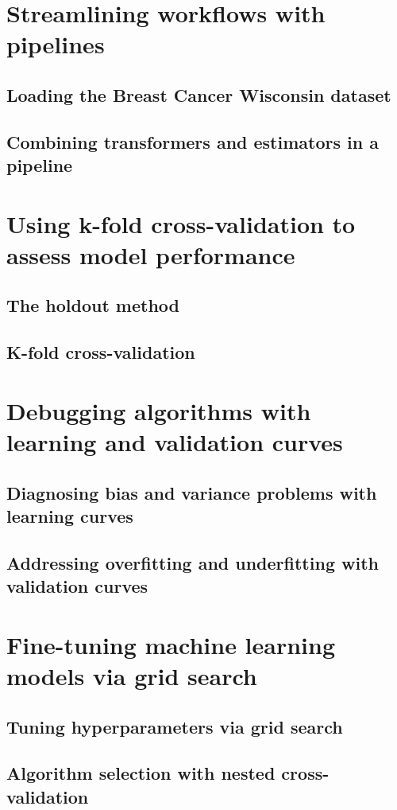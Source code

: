 \documentclass[letterpaper]{report}
\begin{document}
\section{Streamlining workflows with pipelines}
\subsection{Loading the Breast Cancer Wisconsin dataset}
\subsection{Combining transformers and estimators in a pipeline}
\section{Using k-fold cross-validation to assess model performance}
\subsection{The holdout method}
\subsection{K-fold cross-validation}
\section{Debugging algorithms with learning and validation curves}
\subsection{Diagnosing bias and variance problems with learning curves}
\subsection{Addressing overfitting and underfitting with validation curves}

\newpage

\section{Fine-tuning machine learning models via grid search}
\subsection{Tuning hyperparameters via grid search}
\subsection{Algorithm selection with nested cross-validation}
\end{document}

